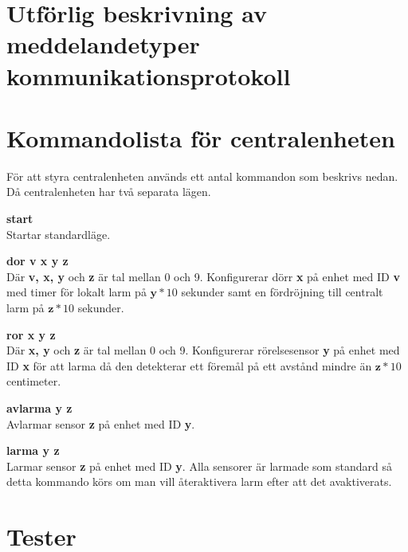 \documentclass{article}
\begin{document}

\appendix
    \section{Utförlig beskrivning av meddelandetyper kommunikationsprotokoll}
    \label{bilaga:protokoll}
        

    \section{Kommandolista för centralenheten}
    \label{kommandon}
        För att styra centralenheten används ett antal kommandon som beskrivs nedan. Då centralenheten har två separata lägen.

    \textbf{start}\\
    Startar standardläge.

    \textbf{dor v x y z}\\
    Där \textbf{v, x, y} och \textbf{z} är tal mellan 0 och 9. Konfigurerar dörr \textbf{x} på enhet med ID \textbf{v} med timer för lokalt larm på  \(\textbf{y} * 10\) sekunder samt en fördröjning till centralt larm på \(\textbf{z} * 10\) sekunder.

    \textbf{ror x y z}\\
    Där \textbf{x, y} och \textbf{z} är tal mellan 0 och 9. Konfigurerar rörelsesensor \textbf{y} på enhet med ID \textbf{x} för att larma då den detekterar ett föremål på ett avstånd mindre än \(\textbf{z} * 10\) centimeter.

    \textbf{avlarma y z} \\
    Avlarmar sensor \textbf{z} på enhet med ID \textbf{y}.

    \textbf{larma y z} \\
    Larmar sensor \textbf{z} på enhet med ID \textbf{y}. Alla sensorer är larmade som standard så detta kommando körs om man vill återaktivera larm efter att det avaktiverats.

	\clearpage
	\section{Tester}
    		\label{bilaga:tester}
     	
	
         
         
         
         
         
         
	
\end{document}
